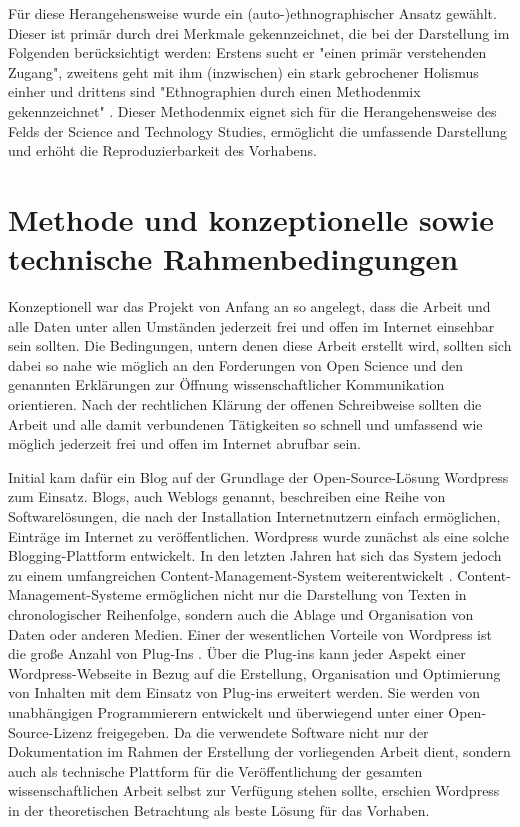 Für diese Herangehensweise wurde ein (auto-)ethnographischer Ansatz gewählt. Dieser ist primär durch drei Merkmale gekennzeichnet, die bei der Darstellung im Folgenden berücksichtigt werden:  Erstens sucht er  "einen primär verstehenden Zugang", zweitens geht mit ihm (inzwischen) ein stark gebrochener Holismus einher und drittens sind "Ethnographien durch einen Methodenmix gekennzeichnet" \cite{bachmann_2011_ethnographie}. Dieser Methodenmix eignet sich für die Herangehensweise des Felds der Science and Technology Studies, ermöglicht die umfassende Darstellung und erhöht die Reproduzierbarkeit des Vorhabens.

\section{Methode und konzeptionelle sowie technische Rahmenbedingungen}

Konzeptionell war das Projekt von Anfang an so angelegt, dass die Arbeit und alle Daten unter allen Umständen jederzeit frei und offen im Internet einsehbar sein sollten. Die Bedingungen, untern denen diese Arbeit erstellt wird, sollten sich dabei so nahe wie möglich an den Forderungen von Open Science und den genannten Erklärungen zur Öffnung wissenschaftlicher Kommunikation orientieren. Nach der rechtlichen Klärung der offenen Schreibweise sollten die Arbeit und alle damit verbundenen Tätigkeiten so schnell und umfassend wie möglich jederzeit frei und offen im Internet abrufbar sein.

Initial kam dafür ein Blog auf der Grundlage der Open-Source-Lösung Wordpress zum Einsatz. Blogs, auch Weblogs genannt, beschreiben eine Reihe von Softwarelösungen, die nach der Installation Internetnutzern einfach ermöglichen, Einträge im Internet zu veröffentlichen. Wordpress wurde zunächst als eine solche Blogging-Plattform entwickelt. In den letzten Jahren hat sich das System jedoch zu einem umfangreichen Content-Management-System weiterentwickelt \cite{Patel_2011}. Content-Management-Systeme ermöglichen nicht nur die Darstellung von Texten in chronologischer Reihenfolge, sondern auch die Ablage und Organisation von Daten oder anderen Medien. Einer der wesentlichen Vorteile von Wordpress ist die große Anzahl von Plug-Ins \cite{Patel_2011}. Über die Plug-ins kann jeder Aspekt einer Wordpress-Webseite in Bezug auf die Erstellung, Organisation und Optimierung von Inhalten mit dem Einsatz von Plug-ins erweitert werden. Sie werden von unabhängigen Programmierern entwickelt und überwiegend unter einer Open-Source-Lizenz freigegeben. Da die verwendete Software nicht nur der Dokumentation im Rahmen der Erstellung der vorliegenden Arbeit dient, sondern auch als technische Plattform für die Veröffentlichung der gesamten wissenschaftlichen Arbeit selbst zur Verfügung stehen sollte, erschien Wordpress in der theoretischen Betrachtung als beste Lösung für das Vorhaben.

